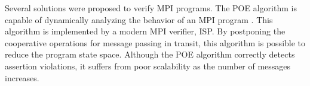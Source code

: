 %
%
% 


Several solutions were proposed to verify MPI programs. The POE algorithm is capable of dynamically analyzing the behavior of an MPI program \cite{DBLP:conf/ppopp/VakkalankaSGK08}. This algorithm is implemented by a modern MPI verifier, ISP. By postponing the cooperative operations for message passing in transit, this algorithm is possible to reduce the program state space. Although the POE algorithm correctly detects assertion violations, it suffers from poor scalability as the number of messages increases. 


